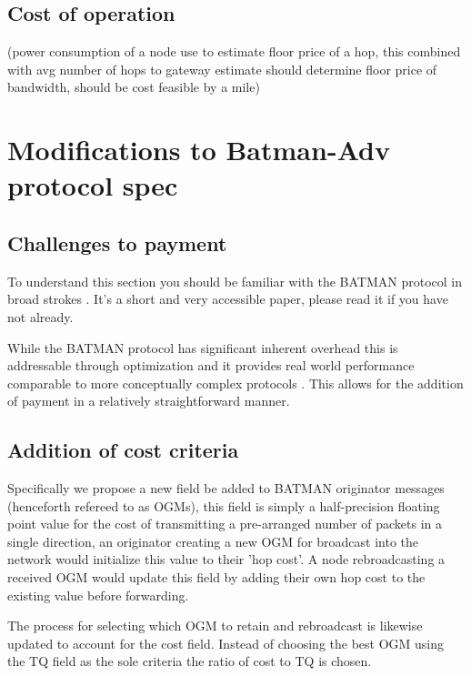 \documentclass[11pt]{article}
\begin{document}
    \subsection{Cost of operation}

    (power consumption of a node use to estimate floor price of a hop, this combined with avg number of hops to gateway estimate should determine floor price of bandwidth, should be cost feasible by a mile)

\section{Modifications to Batman-Adv protocol spec}

	\subsection{Challenges to payment}

	To understand this section you should be familiar with the BATMAN protocol in broad strokes \cite{batman}. It's a short and very accessible paper, please read it if you have not already.

	While the BATMAN protocol has significant inherent overhead this is addressable through optimization \cite{catwoman, batroam} and it provides real world performance comparable to more conceptually complex protocols \cite{meshperf}. This allows for the addition of payment in a relatively straightforward manner.

	\subsection{Addition of cost criteria}

		Specifically we propose a new field be added to BATMAN originator messages (henceforth refereed to as OGMs), this field is simply a half-precision floating point value for the cost of transmitting a pre-arranged number of packets in a single direction, an originator creating a new OGM for broadcast into the network would initialize this value to their 'hop cost'. A node rebroadcasting a received OGM would update this field by adding their own hop cost to the existing value before forwarding.

	        The process for selecting which OGM to retain and rebroadcast is likewise updated to account for the cost field. Instead of choosing the best OGM using the TQ field as the sole criteria the ratio of cost to TQ is chosen.
\end{document}
